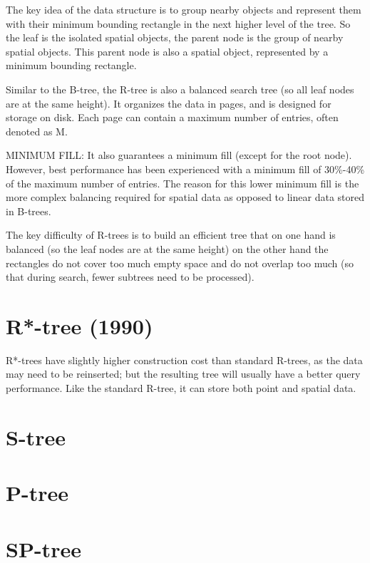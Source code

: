 The key idea of the data structure is to group nearby objects and represent them
with their minimum bounding rectangle in the next higher level of the tree. So
the leaf is the isolated spatial objects, the parent node is the group of nearby
spatial objects. This parent node is also a spatial object, represented by a
minimum bounding rectangle.

Similar to the B-tree, the R-tree is also a balanced search tree (so all leaf nodes are at the same height).
It organizes the data in pages, and is designed for storage on disk.
Each page can contain a maximum number of entries, often denoted as M.

MINIMUM FILL: It also guarantees a minimum fill (except for the root node).
However, best performance has been experienced with a minimum fill of 30\%-40\%
of the maximum number of entries. The reason for this lower minimum fill is the
more complex balancing required for spatial data as opposed to linear data
stored in B-trees.

The key difficulty of R-trees is to build an efficient tree that on one hand is
balanced (so the leaf nodes are at the same height) on the other hand the
rectangles do not cover too much empty space and do not overlap too much (so
that during search, fewer subtrees need to be processed).

\section{R*-tree (1990)}

R*-trees have slightly higher construction cost than standard R-trees, as the data may need to be reinserted; but the resulting tree will usually have a better query performance.
Like the standard R-tree, it can store both point and spatial data. 




\section{S-tree}
\label{sec:tree_S}



\section{P-tree}
\label{sec:tree_P}


\section{SP-tree}
\label{sec:tree_SP}



